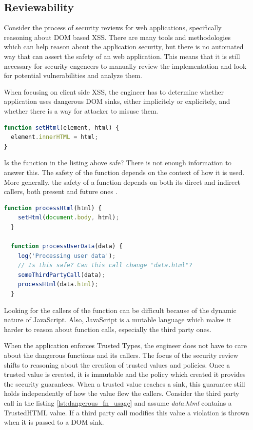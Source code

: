 \subsection{Reviewability}

Consider the process of security reviews for web applications, specifically reasoning about DOM
based XSS. There are many tools and methodologies which can help reason about the application
security, but there is no automated way that can assert the safety of an web application. This means that
it is still necessary for security engeneers to manually review the implementation and look for
potential vulnerabilities and analyze them.

When focusing on client side XSS, the engineer has to determine whether application uses dangerous
DOM sinks, either implicitely or explicitely, and whether there is a way for attacker to misuse them.

\bigskip
\begin{lstlisting}[language=JavaScript, caption=Possibly dangerous function]
function setHtml(element, html) {
  element.innerHTML = html;
}
\end{lstlisting}

Is the function in the listing above safe? There is not enough information to answer this. The
safety of the function depends on the context of how it is used. More generally, the safety of a
function depends on both its direct and indirect callers, both present and future ones
\cite{tt_design_history}.

\bigskip
\begin{lstlisting}[language=JavaScript, caption=Usage of the possibly dangerous function, label={lst:dangerous_fn_usage}]
  function processHtml(html) {
    setHtml(document.body, html);
  }

  function processUserData(data) {
    log('Processing user data');
    // Is this safe? Can this call change "data.html"?
    someThirdPartyCall(data);
    processHtml(data.html);
  }
\end{lstlisting}

Looking for the callers of the function can be difficult because of the dynamic nature of
JavaScript. Also, JavaScript is a mutable language which makes it harder to reason about function
calls, especially the third party ones.

When the application enforces Trusted Types, the engineer does not have to care about the dangerous
functions and its callers. The focus of the security review shifts to reasoning about the creation
of trusted values and policies. Once a trusted value is created, it is immutable and the policy
which created it provides the security guarantees. When a trusted value reaches a sink, this
guarantee still holds independently of how the value flew the callers. Consider the third party call
in the listing \ref{lst:dangerous_fn_usage} and assume \emph{data.html} contains a TrustedHTML
value. If a third party call modifies this value a violation is thrown when it is passed to a DOM
sink.

